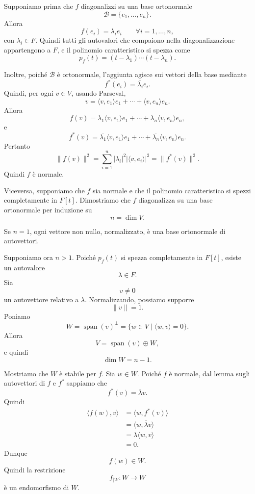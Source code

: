 \documentclass[a4paper]{article}
\begin{document}
\begin{snippetproof}{}
    Supponiamo prima che \(f\) diagonalizzi su una base ortonormale
    \[
        \mathcal{B}=\{e_1,\ldots,e_n\}.
    \]
    Allora
    \[
        f(e_i)=\lambda_i e_i
        \qquad
        \forall i=1,\ldots,n,
    \]
    con \(\lambda_i\in F\). Quindi tutti gli autovalori che compaiono nella diagonalizzazione appartengono a \(F\), e il polinomio caratteristico si spezza come
    \[
        p_f(t)=
        (t-\lambda_1)\cdots(t-\lambda_n).
    \]

    Inoltre, poiché \(\mathcal{B}\) è ortonormale, l'aggiunta agisce sui vettori della base mediante
    \[
        f^*(e_i)=\overline{\lambda_i}e_i.
    \]
    Quindi, per ogni \(v\in V\), usando Parseval,
    \[
        v=\langle v,e_1\rangle e_1+\cdots+\langle v,e_n\rangle e_n.
    \]
    Allora
    \[
        f(v)
        =
        \lambda_1\langle v,e_1\rangle e_1
        +\cdots+
        \lambda_n\langle v,e_n\rangle e_n,
    \]
    e
    \[
        f^*(v)
        =
        \overline{\lambda_1}\langle v,e_1\rangle e_1
        +\cdots+
        \overline{\lambda_n}\langle v,e_n\rangle e_n.
    \]
    Pertanto
    \[
        \|f(v)\|^2
        =
        \sum_{i=1}^{n}|\lambda_i|^2|\langle v,e_i\rangle|^2
        =
        \|f^*(v)\|^2.
    \]
    Quindi \(f\) è normale.

    Viceversa, supponiamo che \(f\) sia normale e che il polinomio caratteristico si spezzi completamente in \(F[t]\). Dimostriamo che \(f\) diagonalizza su una base ortonormale per induzione su
    \[
        n=\dim V.
    \]

    Se \(n=1\), ogni vettore non nullo, normalizzato, è una base ortonormale di autovettori.

    Supponiamo ora \(n>1\). Poiché \(p_f(t)\) si spezza completamente in \(F[t]\), esiste un autovalore
    \[
        \lambda\in F.
    \]
    Sia
    \[
        v\neq 0
    \]
    un autovettore relativo a \(\lambda\). Normalizzando, possiamo supporre
    \[
        \|v\|=1.
    \]
    Poniamo
    \[
        W=\operatorname{span}(v)^\perp
        =
        \{w\in V\mid \langle w,v\rangle=0\}.
    \]
    Allora
    \[
        V=\operatorname{span}(v)\oplus W,
    \]
    e quindi
    \[
        \dim W=n-1.
    \]

    Mostriamo che \(W\) è stabile per \(f\). Sia \(w\in W\). Poiché \(f\) è normale, dal lemma sugli autovettori di \(f\) e \(f^*\) sappiamo che
    \[
        f^*(v)=\overline{\lambda}v.
    \]
    Quindi
    \begin{align*}
        \langle f(w),v\rangle
        &=
        \langle w,f^*(v)\rangle\\
        &=
        \langle w,\overline{\lambda}v\rangle\\
        &=
        \lambda\langle w,v\rangle\\
        &=0.
    \end{align*}
    Dunque
    \[
        f(w)\in W.
    \]
    Quindi la restrizione
    \[
        f_{\mid W}:W\to W
    \]
    è un endomorfismo di \(W\).


\end{snippetproof}
\end{document}
